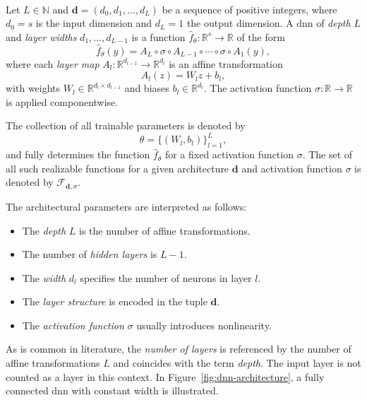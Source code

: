 \begin{definition} \ \\
Let $L \in \mathbb{N}$ and $\mathbf{d} = (d_0, d_1, \dots, d_L)$ be a sequence
of positive integers, where $d_0 = s$ is the input dimension and $d_L = 1$ the
output dimension. A \acf{dnn} of \emph{depth} $L$ and \emph{layer widths} $d_1,
\dots, d_{L-1}$ is a function $\hat{f}_\theta: \mathbb{R}^s \to \mathbb{R}$ of the
form
\begin{equation}
    \label{eq:dnn-definition}
    \hat{f}_\theta(y) = A_L \circ \sigma \circ A_{L-1} \circ \cdots \circ \sigma \circ A_1(y),
\end{equation}
where each \emph{layer map} $A_l: \mathbb{R}^{d_{l-1}} \to \mathbb{R}^{d_l}$ is
an affine transformation
\begin{equation*}
    A_l(z) = W_l z + b_l,
\end{equation*}
with weights $W_l \in \mathbb{R}^{d_l \times d_{l-1}}$ and biases $b_l \in
\mathbb{R}^{d_l}$. The activation function $\sigma: \mathbb{R} \to \mathbb{R}$
is applied componentwise.

The collection of all trainable parameters is denoted by
\begin{equation*}
\theta = \{ (W_l, b_l) \}_{l=1}^L,
\end{equation*}
and fully determines the function $\hat{f}_\theta$ for a fixed activation
function $\sigma$. The set of all such realizable functions for a given
architecture $\mathbf{d}$ and activation function $\sigma$ is denoted by
$\mathcal{F}_{\mathbf{d}, \sigma}$.

\vspace{0.5em}
\noindent The architectural parameters are interpreted as follows:
\begin{itemize}
    \item The \emph{depth} $L$ is the number of affine transformations.
    \item The number of \emph{hidden layers} is $L-1$.
    \item The \emph{width} $d_l$ specifies the number of neurons in layer $l$.
    \item The \emph{layer structure} is encoded in the tuple $\mathbf{d}$.
    \item The \emph{activation function} $\sigma$ usually introduces nonlinearity.
\end{itemize}
\end{definition}

As is common in literature, the \emph{number of layers} is referenced by the number
of affine transformations $L$ and coincides with the term \emph{depth}. The
input layer is not counted as a layer in this context. In
Figure~\ref{fig:dnn-architecture}, a fully connected \ac{dnn} with constant
width is illustrated.

